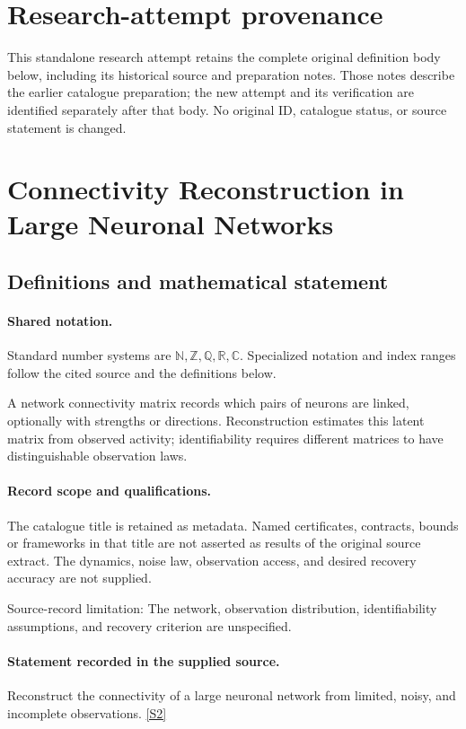 \documentclass[11pt]{article}
\begin{document}
\section*{Research-attempt provenance}
This standalone research attempt retains the complete original definition body below,
including its historical source and preparation notes. Those notes describe the
earlier catalogue preparation; the new attempt and its verification are identified
separately after that body. No original ID, catalogue status, or source statement is changed.

\section{Connectivity Reconstruction in Large Neuronal Networks}\label{statement}

\subsection{Definitions and mathematical statement}

\paragraph{Shared notation.}Standard number systems are $\mathbb N,\mathbb Z,\mathbb Q,\mathbb R,\mathbb C$. Specialized notation and index ranges follow the cited source and the definitions below.


A network connectivity matrix records which pairs of neurons are linked, optionally with strengths or directions. Reconstruction estimates this latent matrix from observed activity; identifiability requires different matrices to have distinguishable observation laws.
\paragraph{Record scope and qualifications.}
The catalogue title is retained as metadata. Named certificates, contracts, bounds or frameworks in that title are not asserted as results of the original source extract.
The dynamics, noise law, observation access, and desired recovery accuracy are not supplied.

Source-record limitation: The network, observation distribution, identifiability assumptions, and recovery criterion are unspecified.
\paragraph{Statement recorded in the supplied source.}
Reconstruct the connectivity of a large neuronal network from limited, noisy, and incomplete observations. \href{https://doi.org/10.4171/owr/2009/39}{[S2]}
\end{document}
